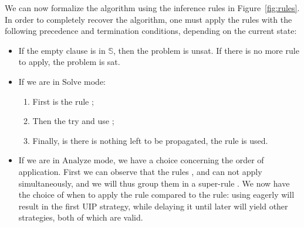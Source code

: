 \documentclass{article}
\begin{document}
We can now formalize the \cdcl{} algorithm using the inference rules
in Figure~\ref{fig:rules}. In order to completely recover the \sat{} algorithm,
one must apply the rules with the following precedence and termination conditions,
depending on the current state:
\begin{itemize}
  \item If the empty clause is in $\mathbb{S}$, then the problem is unsat.
    If there is no more rule to apply, the problem is sat.
  \item If we are in $\text{Solve}$ mode:
    \begin{enumerate}
      \item First is the rule ;
      \item Then the try and use ;
      \item Finally, is there is nothing left to be propagated, the 
        rule is used.
    \end{enumerate}
  \item If we are in $\text{Analyze}$ mode, we have a choice concerning
    the order of application. First we can observe that the rules
    ,  and 
    can not apply simultaneously, and we will thus group them in a super-rule
    . We now have the choice of when to apply the  rule
    compared to the  rule:
    using  eagerly will result in the first UIP strategy, while delaying it
    until later will yield other strategies, both of which are valid.
\end{itemize}
\end{document}
